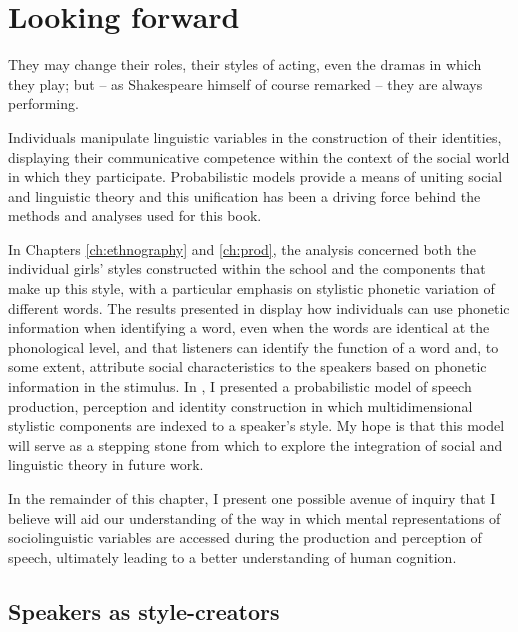 \chapter{Looking forward}
\label{ch:concl}


\epigraph{They may change their roles, their styles of acting, even the dramas in which they play; but -- as Shakespeare himself of course remarked -- they are always performing.}{\citep[35--36]{geertz1973}} 

\noindent Individuals manipulate linguistic variables in the construction of their identities, displaying their communicative competence within the context of the social world in which they participate.  Probabilistic models provide a means of uniting social and linguistic theory and this unification has been a driving force behind the methods and analyses used for this book.  

In Chapters \ref{ch:ethnography} and \ref{ch:prod}, the analysis concerned both the individual girls' styles constructed within the school and the components that make up this style, with a particular emphasis on stylistic phonetic variation of different words.  The results presented in  display how individuals can use phonetic information when identifying a word, even when the words are identical at the phonological level, and that listeners can identify the function of a word and, to some extent, attribute social characteristics to the speakers based on phonetic information in the stimulus.  In , I presented a probabilistic model of speech production, perception and identity construction in which multidimensional stylistic components are indexed to a speaker's style.  My hope is that this model will serve as a stepping stone from which to explore the integration of social and linguistic theory in future work.  

In the remainder of this chapter, I present one possible avenue of inquiry that I believe will aid our understanding of the way in which mental representations of sociolinguistic variables are accessed during the production and perception of speech, ultimately leading to a better understanding of human cognition.

 

\section{Speakers as style-creators}

